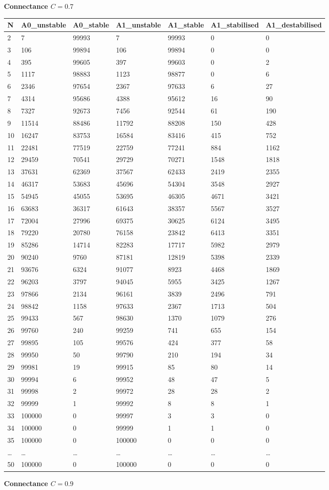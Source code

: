 \documentclass[]{article}
\begin{document}
\textbf{Connectance \(C = 0.7\)}

\begin{longtable}[]{@{}lllllll@{}}
\toprule
N & A0\_unstable & A0\_stable & A1\_unstable & A1\_stable &
A1\_stabilised & A1\_destabilised\tabularnewline
\midrule
\endhead
2 & 7 & 99993 & 7 & 99993 & 0 & 0\tabularnewline
3 & 106 & 99894 & 106 & 99894 & 0 & 0\tabularnewline
4 & 395 & 99605 & 397 & 99603 & 0 & 2\tabularnewline
5 & 1117 & 98883 & 1123 & 98877 & 0 & 6\tabularnewline
6 & 2346 & 97654 & 2367 & 97633 & 6 & 27\tabularnewline
7 & 4314 & 95686 & 4388 & 95612 & 16 & 90\tabularnewline
8 & 7327 & 92673 & 7456 & 92544 & 61 & 190\tabularnewline
9 & 11514 & 88486 & 11792 & 88208 & 150 & 428\tabularnewline
10 & 16247 & 83753 & 16584 & 83416 & 415 & 752\tabularnewline
11 & 22481 & 77519 & 22759 & 77241 & 884 & 1162\tabularnewline
12 & 29459 & 70541 & 29729 & 70271 & 1548 & 1818\tabularnewline
13 & 37631 & 62369 & 37567 & 62433 & 2419 & 2355\tabularnewline
14 & 46317 & 53683 & 45696 & 54304 & 3548 & 2927\tabularnewline
15 & 54945 & 45055 & 53695 & 46305 & 4671 & 3421\tabularnewline
16 & 63683 & 36317 & 61643 & 38357 & 5567 & 3527\tabularnewline
17 & 72004 & 27996 & 69375 & 30625 & 6124 & 3495\tabularnewline
18 & 79220 & 20780 & 76158 & 23842 & 6413 & 3351\tabularnewline
19 & 85286 & 14714 & 82283 & 17717 & 5982 & 2979\tabularnewline
20 & 90240 & 9760 & 87181 & 12819 & 5398 & 2339\tabularnewline
21 & 93676 & 6324 & 91077 & 8923 & 4468 & 1869\tabularnewline
22 & 96203 & 3797 & 94045 & 5955 & 3425 & 1267\tabularnewline
23 & 97866 & 2134 & 96161 & 3839 & 2496 & 791\tabularnewline
24 & 98842 & 1158 & 97633 & 2367 & 1713 & 504\tabularnewline
25 & 99433 & 567 & 98630 & 1370 & 1079 & 276\tabularnewline
26 & 99760 & 240 & 99259 & 741 & 655 & 154\tabularnewline
27 & 99895 & 105 & 99576 & 424 & 377 & 58\tabularnewline
28 & 99950 & 50 & 99790 & 210 & 194 & 34\tabularnewline
29 & 99981 & 19 & 99915 & 85 & 80 & 14\tabularnewline
30 & 99994 & 6 & 99952 & 48 & 47 & 5\tabularnewline
31 & 99998 & 2 & 99972 & 28 & 28 & 2\tabularnewline
32 & 99999 & 1 & 99992 & 8 & 8 & 1\tabularnewline
33 & 100000 & 0 & 99997 & 3 & 3 & 0\tabularnewline
34 & 100000 & 0 & 99999 & 1 & 1 & 0\tabularnewline
35 & 100000 & 0 & 100000 & 0 & 0 & 0\tabularnewline
\ldots{} & \ldots{} & \ldots{} & \ldots{} & \ldots{} & \ldots{} &
\ldots{}\tabularnewline
50 & 100000 & 0 & 100000 & 0 & 0 & 0\tabularnewline
\bottomrule
\end{longtable}

\textbf{Connectance \(C = 0.9\)}
\end{document}

